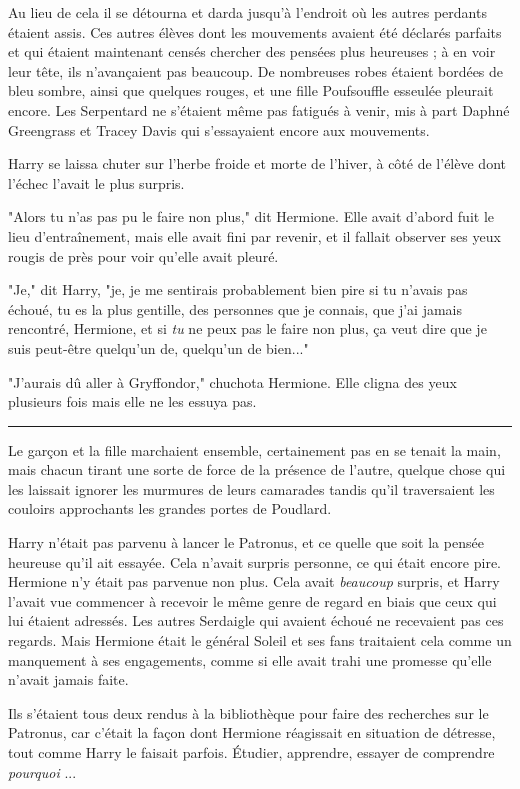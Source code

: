 Au lieu de cela il se détourna et darda jusqu'à l'endroit où les autres perdants étaient assis. Ces autres élèves dont les mouvements avaient été déclarés parfaits et qui étaient maintenant censés chercher des pensées plus heureuses ; à en voir leur tête, ils n'avançaient pas beaucoup. De nombreuses robes étaient bordées de bleu sombre, ainsi que quelques rouges, et une fille Poufsouffle esseulée pleurait encore. Les Serpentard ne s'étaient même pas fatigués à venir, mis à part Daphné Greengrass et Tracey Davis qui s'essayaient encore aux mouvements.

Harry se laissa chuter sur l'herbe froide et morte de l'hiver, à côté de l'élève dont l'échec l'avait le plus surpris.

"Alors tu n'as pas pu le faire non plus," dit Hermione. Elle avait d'abord fuit le lieu d'entraînement, mais elle avait fini par revenir, et il fallait observer ses yeux rougis de près pour voir qu'elle avait pleuré.

"Je," dit Harry, "je, je me sentirais probablement bien pire si tu n'avais pas échoué, tu es la plus gentille, des personnes que je connais, que j'ai jamais rencontré, Hermione, et si \emph{tu}  ne peux pas le faire non plus, ça veut dire que je suis peut-être quelqu'un de, quelqu'un de bien..."

"J'aurais dû aller à Gryffondor," chuchota Hermione. Elle cligna des yeux plusieurs fois mais elle ne les essuya pas.
\par\noindent\rule{\textwidth}{0.4pt}
Le garçon et la fille marchaient ensemble, certainement pas en se tenait la main, mais chacun tirant une sorte de force de la présence de l'autre, quelque chose qui les laissait ignorer les murmures de leurs camarades tandis qu'il traversaient les couloirs approchants les grandes portes de Poudlard.

Harry n'était pas parvenu à lancer le Patronus, et ce quelle que soit la pensée heureuse qu'il ait essayée. Cela n'avait surpris personne, ce qui était encore pire. Hermione n'y était pas parvenue non plus. Cela avait \emph{beaucoup } surpris, et Harry l'avait vue commencer à recevoir le même genre de regard en biais que ceux qui lui étaient adressés. Les autres Serdaigle qui avaient échoué ne recevaient pas ces regards. Mais Hermione était le général Soleil et ses fans traitaient cela comme un manquement à ses engagements, comme si elle avait trahi une promesse qu'elle n'avait jamais faite.

Ils s'étaient tous deux rendus à la bibliothèque pour faire des recherches sur le Patronus, car c'était la façon dont Hermione réagissait en situation de détresse, tout comme Harry le faisait parfois. Étudier, apprendre, essayer de comprendre \emph{pourquoi} ...

